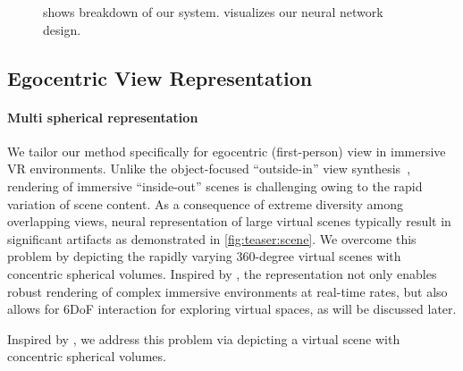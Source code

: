 \begin{figure}[htb]
    {%
     shows breakdown of our system.
     visualizes our neural network design.
    }
    \label{fig:system}
\end{figure}



\subsection{Egocentric View Representation}
\label{sec:method:representation}
\paragraph{Multi spherical representation}
We tailor our method specifically for egocentric (first-person) view in immersive VR environments.
Unlike the object-focused ``outside-in'' view synthesis~\cite{sitzmann2019deepvoxels,mildenhall2020nerf}, rendering of immersive ``inside-out'' scenes is challenging owing to the rapid variation of scene content. As a consequence of extreme diversity among overlapping views, neural representation of large virtual scenes typically result in significant artifacts as demonstrated in \cref{fig:teaser:scene}. 
We overcome this problem by depicting the rapidly varying 360-degree virtual scenes with concentric spherical volumes. 
Inspired by \cite{Lin:DeepPanorama,Benjamin:2020:RTV}, the representation not only enables robust rendering of complex immersive environments at real-time rates, but also allows for 6DoF interaction for exploring virtual spaces, as will be discussed later.

Inspired by \cite{Broxton:immersiveLF,Lin:DeepPanorama}, we address this problem via depicting a virtual scene with concentric spherical volumes.  

